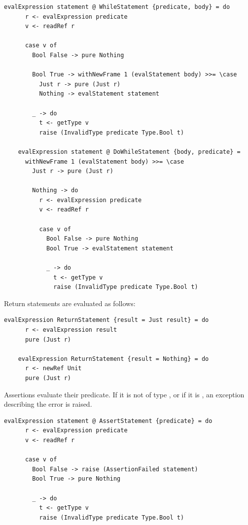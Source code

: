 \documentclass[UdineBachThesis,american,11pt]{PhdThesis}
\begin{document}
  \begin{lstlisting}[gobble=4,basicstyle=\ttfamily\small]
    evalExpression statement @ WhileStatement {predicate, body} = do
      r <- evalExpression predicate
      v <- readRef r

      case v of
        Bool False -> pure Nothing

        Bool True -> withNewFrame 1 (evalStatement body) >>= \case
          Just r -> pure (Just r)
          Nothing -> evalStatement statement

        _ -> do
          t <- getType v
          raise (InvalidType predicate Type.Bool t)

    evalExpression statement @ DoWhileStatement {body, predicate} =
      withNewFrame 1 (evalStatement body) >>= \case
        Just r -> pure (Just r)

        Nothing -> do
          r <- evalExpression predicate
          v <- readRef r

          case v of
            Bool False -> pure Nothing
            Bool True -> evalStatement statement

            _ -> do
              t <- getType v
              raise (InvalidType predicate Type.Bool t)
  \end{lstlisting}

  Return statements are evaluated as follows:

  \begin{lstlisting}[gobble=4,basicstyle=\ttfamily\small]
    evalExpression ReturnStatement {result = Just result} = do
      r <- evalExpression result
      pure (Just r)

    evalExpression ReturnStatement {result = Nothing} = do
      r <- newRef Unit
      pure (Just r)
  \end{lstlisting}

  Assertions evaluate their predicate. If it is not of type \lstinline@Bool@,
  or if it is \lstinline@false@, an exception describing the error is raised.

  \begin{lstlisting}[gobble=4,basicstyle=\ttfamily\small]
    evalExpression statement @ AssertStatement {predicate} = do
      r <- evalExpression predicate
      v <- readRef r

      case v of
        Bool False -> raise (AssertionFailed statement)
        Bool True -> pure Nothing

        _ -> do
          t <- getType v
          raise (InvalidType predicate Type.Bool t)
  \end{lstlisting}
\end{document}
